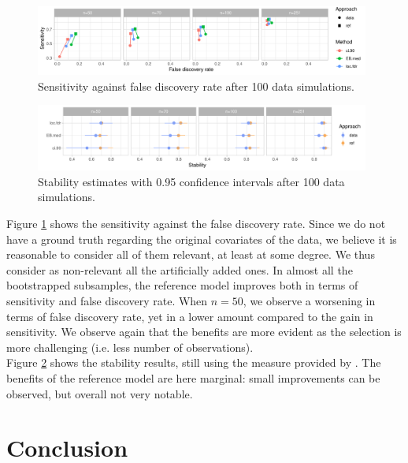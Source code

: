 \documentclass[american,]{article}
\theoremstyle{definition}
\begin{document}
\begin{figure}[tp]
  \centering
  \includegraphics[width=0.98\textwidth]{graphics/bodyfat_sensitivity_vs_fdr.pdf}
  \caption{Sensitivity against false discovery rate after 100 data simulations.\\}
  \label{fig:bodyfat_sensitivity_vs_fdr}
\end{figure}

\begin{figure}[tp]
  \centering
  \includegraphics[width=0.98\textwidth]{graphics/bodyfat_stability.pdf}
  \caption{Stability estimates with 0.95 confidence intervals after 100 data simulations.\\}
  \label{fig:bodyfat_stability}
\end{figure}

Figure \ref{fig:bodyfat_sensitivity_vs_fdr} shows the sensitivity against the false discovery rate. Since we do not have a ground truth regarding the original covariates of the data, we believe it is reasonable to consider all of them relevant, at least at some degree. We thus consider as non-relevant all the artificially added ones. In almost all the bootstrapped subsamples, the reference model improves both in terms of sensitivity and false discovery rate. When $n=50$, we observe a worsening in terms of false discovery rate, yet in a lower amount compared to the gain in sensitivity.  We observe again that the benefits are more evident as the selection is more challenging (i.e. less number of observations).
\\
Figure \ref{fig:bodyfat_stability} shows the stability results, still using the measure provided by \cite{paper:stability}. The benefits of the reference model are here marginal: small improvements can be observed, but overall not very notable.


\hypertarget{conclusion}{%
\section{Conclusion}\label{conclusion}}
\end{document}
